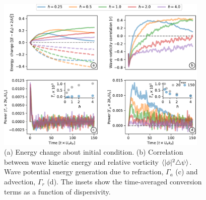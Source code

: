 \documentclass[final]{beamer}
\begin{document}
\begin{frame}[t]
\begin{columns}[t]
\begin{column}{0.55\textwidth}
\begin{columns}
\begin{column}{.475\textwidth}
                        \begin{figure}
                          \includegraphics[width=0.95\textwidth]{figs/hslash_dependence_turbulence.pdf}
                          \caption{(a) Energy change about initial condition.
                                  (b)  Correlation between
                                  wave
                                  kinetic energy and relative vorticity $\langle|\phi|^2\triangle\psi\rangle$. Wave potential
                                  energy generation
                                  due to refraction, $\Gamma_a$ (c) and advection, $\Gamma_r$ (d).
                                   The insets show the time-averaged conversion terms as a function
                                   of dispersivity.}
                        \end{figure}

                      \end{column}

                      \hspace{0.cm}

                      \begin{column}{0.475\textwidth}


\end{column}
\end{columns}
\end{column}
\end{columns}
\end{frame}
\end{document}
